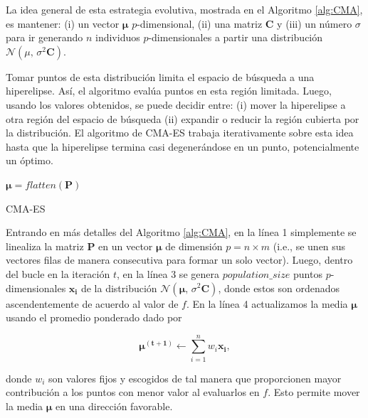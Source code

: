 La idea general de esta estrategia evolutiva, mostrada en el Algoritmo
\ref{alg:CMA}, es mantener:
(i) un vector $\boldsymbol{\mu}$ $p$-dimensional,
(ii) una matriz $\boldsymbol{C}$ y
(iii) un número $\sigma$ para ir generando $n$ individuos $p$-dimensionales
a partir una distribución $\mathcal{N}(\mu,\,\sigma^{2} \boldsymbol{C})$.


Tomar puntos de esta distribución limita el espacio de búsqueda a una
hiperelipse.
Así, el algoritmo evalúa puntos en esta región limitada.
Luego, usando los valores obtenidos, se puede decidir entre:
(i) mover la hiperelipse a otra región del espacio de búsqueda
(ii) expandir o reducir la región cubierta por la distribución.
El algoritmo de CMA-ES trabaja iterativamente sobre esta idea hasta que la
hiperelipse termina casi degenerándose en un punto, 
potencialmente un óptimo.

\begin{algorithm}
\KwResult{$\boldsymbol{\mu}$}
$\boldsymbol{\mu} = flatten(\boldsymbol{P})$ \\
\caption{CMA-ES}
\label{alg:CMA}
\end{algorithm}


Entrando en más detalles del Algoritmo \ref{alg:CMA},
en la línea 1 simplemente se linealiza la matriz $\boldsymbol{P}$ en un vector $\boldsymbol{\mu}$ 
de dimensión $p = n \times m$ (i.e., se unen sus vectores filas de manera consecutiva para formar un solo vector).
Luego, dentro del bucle en la iteración $t$, en la línea 3 se genera $population\_size$ puntos
$p$-dimensionales $\boldsymbol{x_i}$ de la distribución $\mathcal{N}(\boldsymbol{\mu},\,\sigma^{2} \boldsymbol{C})$, 
donde estos son ordenados ascendentemente de acuerdo
al valor de $f$.
En la línea 4 actualizamos la media $\boldsymbol{\mu}$ usando el promedio ponderado dado
por

\begin{equation}
  \boldsymbol{\mu^{(t + 1)}} \gets \sum_{i=1}^{n} w_i \boldsymbol{x_i},
\label{cma-average}
\end{equation}

\noindent donde $w_i$ son valores fijos y escogidos de tal manera que proporcionen mayor
contribución a los puntos con menor valor al evaluarlos en $f$. 
Esto permite mover la media $\boldsymbol{\mu}$ en una dirección favorable.

